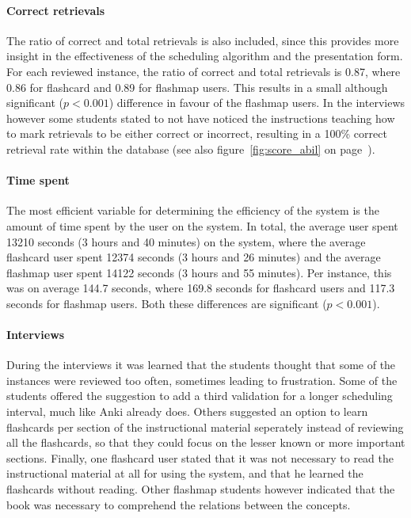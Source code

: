 \paragraph{Correct retrievals} The ratio of correct and total retrievals is also included, since this provides more insight in the effectiveness of the scheduling algorithm and the presentation form. For each reviewed instance, the ratio of correct and total retrievals is 0.87, where 0.86 for flashcard and 0.89 for flashmap users. This results in a small although significant ($p<0.001$) difference in favour of the flashmap users. In the interviews however some students stated to not have noticed the instructions teaching how to mark retrievals to be either correct or incorrect, resulting in a 100\% correct retrieval rate within the database (see also figure~\ref{fig:score_abil} on page~\pageref{fig:score_abil}).

\paragraph{Time spent} The most efficient variable for determining the efficiency of the system is the amount of time spent by the user on the system. In total, the average user spent 13210 seconds (3 hours and 40 minutes) on the system, where the average flashcard user spent 12374 seconds (3 hours and 26 minutes) and the average flashmap user spent 14122 seconds (3 hours and 55 minutes). Per instance, this was on average 144.7 seconds, where 169.8 seconds for flashcard users and 117.3 seconds for flashmap users. Both these differences are significant ($p<0.001$).

\paragraph{Interviews} During the interviews it was learned that the students thought that some of the instances were reviewed too often, sometimes leading to frustration. Some of the students offered the suggestion to add a third validation for a longer scheduling interval, much like Anki already does. Others suggested an option to learn flashcards per section of the instructional material seperately instead of reviewing all the flashcards, so that they could focus on the lesser known or more important sections. Finally, one flashcard user stated that it was not necessary to read the instructional material at all for using the system, and that he learned the flashcards without reading. Other flashmap students however indicated that the book was necessary to comprehend the relations between the concepts.

